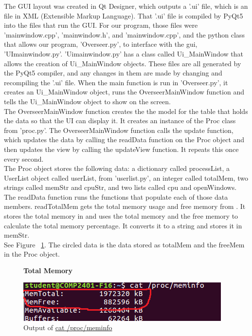 \documentclass[12pt]{article}
\begin{document}
The GUI layout was created in Qt Designer, which outputs a '.ui' file, which is an file in XML (Extensible Markup Language).
That '.ui' file is compiled by PyQt5 into the files that run the GUI.
For our program, those files were 'mainwindow.cpp', 'mainwindow.h', and 'mainwindow.cpp', and the python class that allows our program, 'Overseer.py', to interface with the gui, 'UImainwindow.py'.
'Uimainwindow.py' has a class called Ui\_MainWindow that allows the creation of Ui\_MainWindow objects.
These files are all generated by the PyQt5 compiler, and any changes in them are made by changing and recompiling the '.ui' file.
When the main function is run in 'Overseer.py', it creates an Ui\_MainWindow object, runs the OverseerMainWindow function and tells the Ui\_MainWindow object to show on the screen.\\
The OverseerMainWindow function creates the the model for the table that holds the data so that the UI can display it.
It creates an instance of the Proc class from 'proc.py'.
The OverseerMainWindow function calls the update function, which updates the data by calling the readData function on the Proc object and then updates the view by calling the updateView function.
It repeats this once every second.\\
The Proc object stores the following data: a dictionary called processList, a UserList object called userList, from 'userlist.py', an integer called totalMem, two strings called memStr and cpuStr, and two lists called cpu and openWindows.\\
The readData function runs the functions that populate each of those data members.
readTotalMem gets the total memory usage and free memory from . It stores the total memory in and uses the total memory and the free memory to calculate the total memory percentage. It converts it to a string and stores it in memStr.\\
See Figure ~\ref{figTotalMem}.
The circled data is the data stored as totalMem and the freeMem in the Proc object.\\
\begin{figure}[h]
	\centering
	\textbf{Total Memory}\par\medskip
	\includegraphics{totalMem}
	\caption{Output of \url{cat /proc/meminfo}}
	\label{figTotalMem}
\end{figure}
\end{document}
